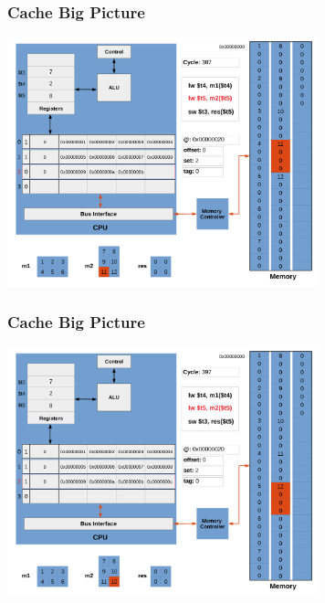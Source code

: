 \documentclass{beamer}
\begin{document}
\begin{frame}[fragile]
\frametitle{Cache Big Picture}

\begin{center}
\vspace*{-0.23cm}
\hspace*{-1cm}\includegraphics[width=9cm]{cache25.pdf}
\end{center}

\end{frame}

\begin{frame}[fragile]
\frametitle{Cache Big Picture}

\begin{center}
\vspace*{-0.23cm}
\hspace*{-1cm}\includegraphics[width=9cm]{cache26.pdf}
\end{center}

\end{frame}
\end{document}
